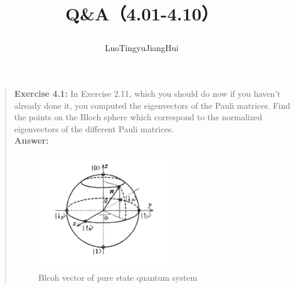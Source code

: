 \documentclass[UTF8]{ctexart}
\begin{document}
	\title{\textbf{Q\&A（4.01-4.10）}\\[1ex]\begin{large}
		\end{large}}
	\author{LuoTingyu\quad JiangHui}
	\maketitle
\begin{quote}
\textbf{Exercise 4.1: } In Exercise 2.11, which you should do now if you haven’t already done it,
 you computed the eigenvectors of the Pauli matrices. Find the points on the Bloch sphere which correspond to the normalized 
 eigenvectors of the different Pauli matrices.
\\
\textbf{Answer:}\\
\begin{figure}[h]
	\centering
	\includegraphics[width=6cm,height=5cm]{bloch.jpg}
	\caption{Blcoh vector of pure state quantum system 	}
	\end{figure}


\end{quote}
\end{document}

